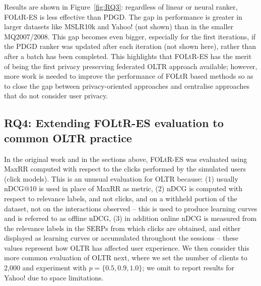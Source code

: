 Results are shown in Figure~\ref{fig:RQ3}: regardless of linear or neural ranker, FOLtR-ES is less effective than PDGD. The gap in performance is greater in larger datasets like MSLR10k and Yahoo! (not shown) than in the smaller MQ2007/2008. This gap becomes even bigger, especially for the first iterations, if the PDGD ranker was updated after each iteration (not shown here), rather than after a batch has been completed. This highlights that FOLtR-ES has the merit of being the first privacy preserving federated OLTR approach available; however, more work is needed to improve the performance of FOLtR based methods so as to close the gap between privacy-oriented approaches and centralise approaches that do not consider user privacy.

\subsection{RQ4: Extending FOLtR-ES evaluation to common OLTR practice}
In the original work and in the sections above, FOLtR-ES was evaluated using MaxRR computed with respect to the clicks performed by the simulated users (click models). This is an unusual evaluation for OLTR because: (1) usually nDCG@10 is used in place of MaxRR as metric, (2) nDCG is computed with respect to relevance labels, and not clicks, and on a withheld portion of the dataset, not on the interactions observed -- this is used to produce learning curves and is referred to as offline nDCG, (3) in addition online nDCG is measured from the relevance labels in the SERPs from which clicks are obtained, and either displayed as learning curves or accumulated throughout the sessions -- these values represent how OLTR has affected user experience. We then consider this more common evaluation of OLTR next, where we set the number of clients to 2,000 and experiment with $p=\{0.5, 0.9, 1.0\}$; we omit to report results for Yahoo! due to space limitations. 

